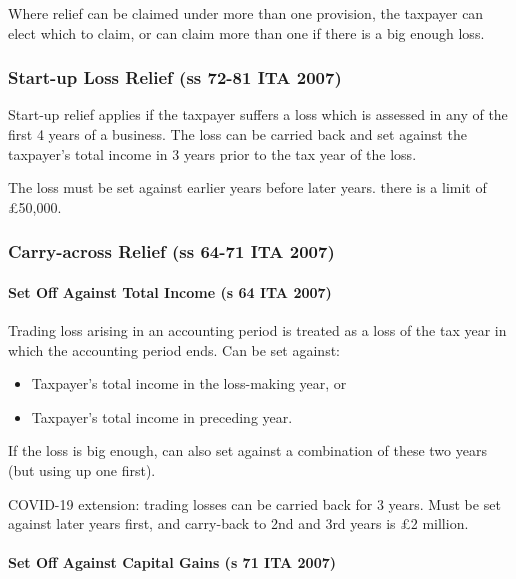 \documentclass[
]{article}
\providecommand{\tightlist}{%
  \setlength{\itemsep}{0pt}\setlength{\parskip}{0pt}}
\begin{document}
Where relief can be claimed under more than one provision, the taxpayer
can elect which to claim, or can claim more than one if there is a big
enough loss.

\hypertarget{start-up-loss-relief-ss-72-81-ita-2007}{%
\subsubsection{Start-up Loss Relief (ss 72-81 ITA
2007)}\label{start-up-loss-relief-ss-72-81-ita-2007}}

Start-up relief applies if the taxpayer suffers a loss which is assessed
in any of the first 4 years of a business. The loss can be carried back
and set against the taxpayer's total income in 3 years prior to the tax
year of the loss.

The loss must be set against earlier years before later years. there is
a limit of £50,000.

\hypertarget{carry-across-relief-ss-64-71-ita-2007}{%
\subsubsection{Carry-across Relief (ss 64-71 ITA
2007)}\label{carry-across-relief-ss-64-71-ita-2007}}

\hypertarget{set-off-against-total-income-s-64-ita-2007}{%
\paragraph{Set Off Against Total Income (s 64 ITA
2007)}\label{set-off-against-total-income-s-64-ita-2007}}

Trading loss arising in an accounting period is treated as a loss of the
tax year in which the accounting period ends. Can be set against:

\begin{itemize}
\tightlist
\item
  Taxpayer's total income in the loss-making year, or
\item
  Taxpayer's total income in preceding year.
\end{itemize}

If the loss is big enough, can also set against a combination of these
two years (but using up one first).

COVID-19 extension: trading losses can be carried back for 3 years. Must
be set against later years first, and carry-back to 2nd and 3rd years is
£2 million.

\hypertarget{set-off-against-capital-gains-s-71-ita-2007}{%
\paragraph{Set Off Against Capital Gains (s 71 ITA
2007)}\label{set-off-against-capital-gains-s-71-ita-2007}}
\end{document}
